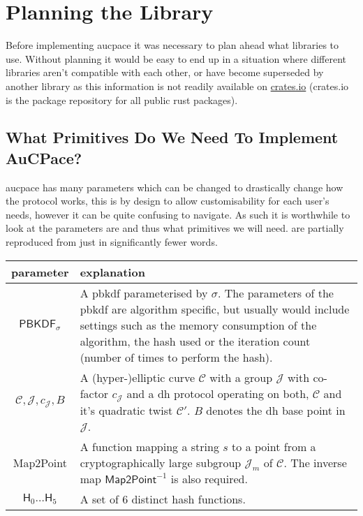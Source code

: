 \section{Planning the Library}
Before implementing \gls{aucpace} it was necessary to plan ahead what libraries to use.
Without planning it would be easy to end up in a situation where different libraries aren't compatible with each other, or have become superseded by another library as this information is not readily available on \href{https://crates.io/}{crates.io} (crates.io is the package repository for all public rust packages).

\subsection{What Primitives Do We Need To Implement AuCPace?}
\gls{aucpace} has many parameters which can be changed to drastically change how the protocol works, this is by design to allow customisability for each user's needs, however it can be quite confusing to navigate.
As such it is worthwhile to look at the parameters are and thus what primitives we will need.
 are partially reproduced from \cite{aucpace} just in significantly fewer words.

\begin{center}
  \label{tab:aucpace-params}
  \begin{tabularx}{\linewidth}{ cX }
    \toprule
    parameter & explanation \\
    \midrule
    $\textsf{PBKDF}_{\sigma}$ & A \gls{pbkdf} parameterised by $\sigma$.
    The parameters of the \gls{pbkdf} are algorithm specific, but usually would include settings such as the memory consumption of the algorithm, the hash used or the iteration count (number of times to perform the hash). \\
    $\mathcal{C}, \mathcal{J}, c_{\mathcal{J}}, B$ & A (hyper-)elliptic curve $\mathcal{C}$ with a group $\mathcal{J}$ with co-factor $c_{\mathcal{J}}$ and a \gls{dh} protocol operating on both, $\mathcal{C}$ and it's quadratic twist $\mathcal{C}'$. $B$ denotes the \gls{dh} base point in $\mathcal{J}$.\\
    \textsf{Map2Point} & A function mapping a string $s$ to a point from a cryptographically large subgroup $\mathcal{J}_m$ of $\mathcal{C}$. The inverse map $\textsf{Map2Point}^{-1}$ is also required.\\
    $\textsf{H}_0 \dots \textsf{H}_5$ & A set of 6 distinct hash functions.\\
    \bottomrule
  \end{tabularx}
\end{center}

